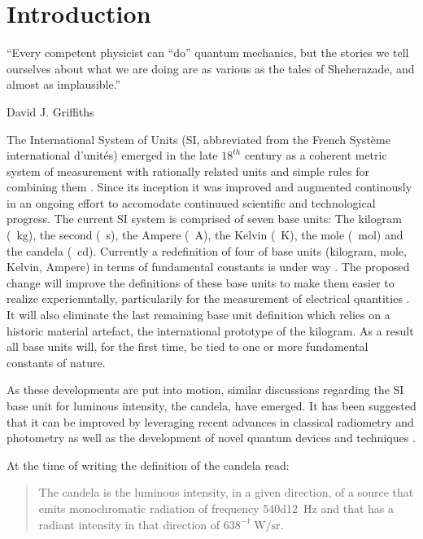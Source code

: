 

\chapter{Introduction}	\label{ch::introduction}

		\epigraph{``Every competent physicist can \enquote{do} quantum mechanics, but the stories we tell ourselves about what we are doing are as various as the tales of Sheherazade, and almost as implausible.''}{\textup{David J. Griffiths}}

		The International System of Units (SI, abbreviated from the French Syst\`eme international d'unit\'es) emerged in the late $18^{th}$ century as a coherent metric system of measurement with rationally related units and simple rules for combining them \cite{zwinckels::1}. Since its inception it was improved and augmented continously in an ongoing effort to accomodate continuued scientific and technological progress. The current SI system is comprised of seven base units: The kilogram (\SI{}{\kg}), the second (\SI{}{\s}), the Ampere (\SI{}{\ampere}), the Kelvin (\SI{}{\kelvin}), the mole (\SI{}{\mole}) and the candela (\SI{}{\candela}). Currently a redefinition of four of base units (kilogram, mole, Kelvin, Ampere) in terms of fundamental constants is under way \cite{zwinckels::3, Milton, Martin (14 November 2016). Highlights in the work of the BIPM in 2016}. The proposed change will improve the definitions of these base units to make them easier to realize experiemntally, particularily for the measurement of electrical quantities \cite{zwinckels::paper}. It will also eliminate the last remaining base unit definition which relies on a historic material artefact, the international prototype of the kilogram. As a result all base units will, for the first time, be tied to one or more fundamental constants of nature.

		As these developments are put into motion, similar discussions regarding the SI base unit for luminous intensity, the candela, have emerged. It has been suggested that it can be improved by leveraging recent advances in classical radiometry and photometry as well as the development of novel quantum devices and techniques \cite{Cheung2007}.

		At the time of writing the definition of the candela read:

		\begin{quote}
		The candela is the luminous intensity, in a given direction, of a source that emits monochromatic radiation of frequency \SI{540d12}{\hertz} and that has a radiant intensity in that direction of $638^{-1} \SI{}{\watt\per\steradian}$.
	  \end{quote}

